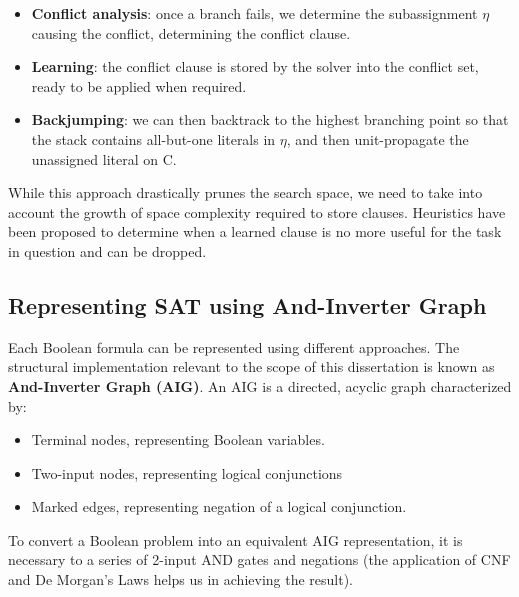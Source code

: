 \begin{itemize}
    \item \textbf{Conflict analysis}: once a branch fails, we determine the subassignment $\eta$ causing the conflict, determining the conflict clause.
    \item \textbf{Learning}: the conflict clause is stored by the solver into the conflict set, ready to be applied when required.
    \item \textbf{Backjumping}: we can then backtrack to the highest branching point so that the stack contains all-but-one literals in $\eta$, and then unit-propagate the unassigned literal on C.
\end{itemize}

While this approach drastically prunes the search space, we need to take into account the growth of space complexity required to store clauses. Heuristics have been proposed to determine when a learned clause is no more useful for the task in question and can be dropped.

\subsection{Representing SAT using And-Inverter Graph}

Each Boolean formula can be represented using different approaches. The structural implementation relevant to the scope of this dissertation is known as \textbf{And-Inverter Graph (AIG)}. An AIG is a directed, acyclic graph characterized by:

\begin{itemize}
    \item Terminal nodes, representing Boolean variables.
    \item Two-input nodes, representing logical conjunctions
    \item Marked edges, representing negation of a logical conjunction.
\end{itemize}

To convert a Boolean problem into an equivalent AIG representation, it is necessary to a series of 2-input AND gates and negations (the application of CNF and De Morgan's Laws helps us in achieving the result). 

